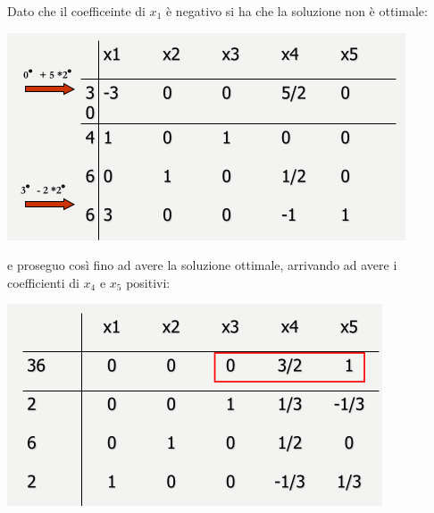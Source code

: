 \documentclass[a4paper,12pt, oneside]{book}
\begin{document}
Dato che il coefficeinte di $x_1$ è negativo si ha che la soluzione
non è ottimale:
\begin{center}
  \includegraphics[scale = 0.8]{img/tab4.png}
\end{center}
e proseguo così fino ad avere la soluzione ottimale, arrivando ad
avere i coefficienti di $x_4$ e $x_5$ positivi:
\begin{center}
  \includegraphics[scale = 0.8]{img/tab5.png}
\end{center}
\end{document}

